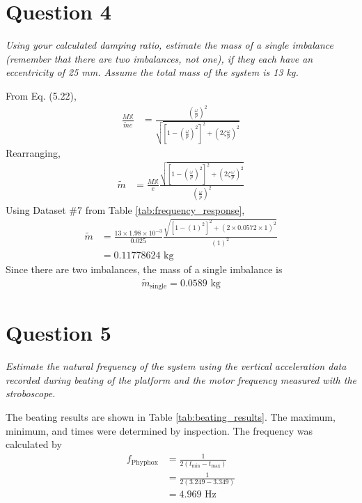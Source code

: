 \section{Question 4}
\textit{Using your calculated damping ratio, estimate the mass of a single imbalance (remember that there are two imbalances, not one), if they each have an eccentricity of 25 mm. Assume the total mass of the system is 13 kg.}

From Eq. (5.22),
\begin{align*}
    \frac{M \mathbb{X}}{\tilde{m}e} &= \frac{\left(\frac{\omega}{p}\right)^2}{\sqrt{\left[1 - \left(\frac{\omega}{p}\right)^2\right]^2 + \left(2\zeta\frac{\omega}{p}\right)^2}} 
\end{align*}
Rearranging,
\begin{align*}
    \tilde{m} &= \frac{M \mathbb{X}}{e} \frac{\sqrt{\left[1 - \left(\frac{\omega}{p}\right)^2\right]^2 + \left(2\zeta\frac{\omega}{p}\right)^2}}{\left(\frac{\omega}{p}\right)^2} 
\end{align*}
Using Dataset \#7 from Table \ref{tab:frequency_response}, 
\begin{align*}
    \tilde{m} &= \frac{13 \times 1.98 \times 10^{-3}}{0.025} \frac{\sqrt{\left[1 - \left(1\right)^2\right]^2 + \left(2 \times 0.0572 \times 1\right)^2}}{\left(1\right)^2} \\
    &= 0.11778624 \text{ kg}
\end{align*}
Since there are two imbalances, the mass of a single imbalance is 
\begin{align*}
    \boxed{\tilde{m}_{\text{single}} = 0.0589 \text{ kg}}
\end{align*}

\section{Question 5}
\textit{Estimate the natural frequency of the system using the vertical acceleration data recorded during beating of the platform and the motor frequency measured with the stroboscope.}

The beating results are shown in Table \ref{tab:beating_results}. The maximum, minimum, and times were determined by inspection. The frequency was calculated by
\begin{align*}
    f_{\text{Phyphox}} &= \frac{1}{2(t_{\text{min}} - t_{\text{max}})} \\
    &= \frac{1}{2(3.249 - 3.349)} \\
    &= \boxed{4.969 \text{ Hz}}
\end{align*}

